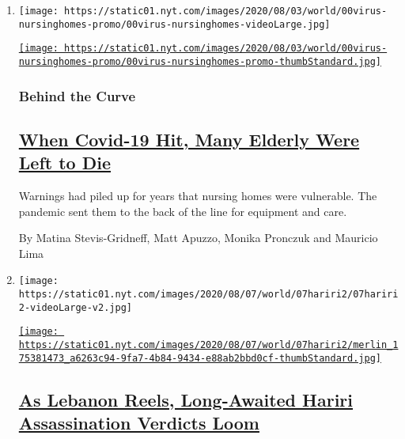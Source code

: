 \begin{enumerate}
\def\labelenumi{\arabic{enumi}.}
\item
  \texttt{[image: https://static01.nyt.com/images/2020/08/03/world/00virus-nursinghomes-promo/00virus-nursinghomes-videoLarge.jpg]}

  \href{/2020/08/08/world/europe/coronavirus-nursing-homes-elderly.html}{\texttt{[image: https://static01.nyt.com/images/2020/08/03/world/00virus-nursinghomes-promo/00virus-nursinghomes-promo-thumbStandard.jpg]}}

  \hypertarget{behind-the-curve}{%
  \subsubsection{Behind the Curve}\label{behind-the-curve}}

  \hypertarget{when-covid-19-hit-many-elderly-were-left-to-die}{%
  \subsection{\texorpdfstring{\href{/2020/08/08/world/europe/coronavirus-nursing-homes-elderly.html}{When
  Covid-19 Hit, Many Elderly Were Left to
  Die}}{When Covid-19 Hit, Many Elderly Were Left to Die}}\label{when-covid-19-hit-many-elderly-were-left-to-die}}

  Warnings had piled up for years that nursing homes were vulnerable.
  The pandemic sent them to the back of the line for equipment and care.

  By Matina Stevis-Gridneff, Matt Apuzzo, Monika Pronczuk and Mauricio
  Lima
\item
  \texttt{[image: https://static01.nyt.com/images/2020/08/07/world/07hariri2/07hariri2-videoLarge-v2.jpg]}

  \href{/2020/08/08/world/middleeast/hariri-assassination-trial-hague.html}{\texttt{[image: https://static01.nyt.com/images/2020/08/07/world/07hariri2/merlin\_175381473\_a6263c94-9fa7-4b84-9434-e88ab2bbd0cf-thumbStandard.jpg]}}

  \hypertarget{as-lebanon-reels-long-awaited-hariri-assassination-verdicts-loom}{%
  \subsection{\texorpdfstring{\href{/2020/08/08/world/middleeast/hariri-assassination-trial-hague.html}{As
  Lebanon Reels, Long-Awaited Hariri Assassination Verdicts
  Loom}}{As Lebanon Reels, Long-Awaited Hariri Assassination Verdicts Loom}}\label{as-lebanon-reels-long-awaited-hariri-assassination-verdicts-loom}}


\end{enumerate}

